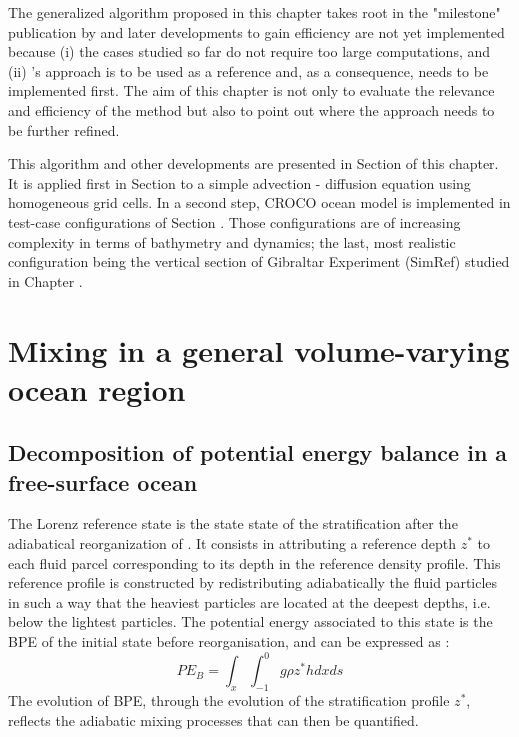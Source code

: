 The generalized algorithm proposed in this chapter takes root in the "milestone" publication by \citet{winters_available_1995} 
and later developments to gain efficiency are not yet implemented because (i) the cases studied so far do not require too large computations, and (ii) \citet{winters_available_1995}'s approach is to be used as a reference and, as a consequence, needs to be implemented first. The aim of this chapter is not only to evaluate the relevance and efficiency of the method but also to point out where the approach needs to be further refined.

This algorithm and other developments are presented in Section  of this chapter. It is applied first in Section  to a simple advection - diffusion equation using homogeneous grid cells. In a second step, CROCO ocean model is implemented in test-case configurations of Section . Those configurations are of increasing complexity in terms of bathymetry and dynamics; the last, most realistic configuration being the vertical section of Gibraltar Experiment (SimRef) studied in Chapter .

\section{Mixing in a general volume-varying ocean region}
\label{section_mix_vol}
\subsection{Decomposition of potential energy balance in a free-surface ocean}
\label{section_PE_chap2}

The Lorenz reference state is the state state of the stratification after the adiabatical reorganization of \citet{lorenz_available_1955}. It consists in attributing a reference depth $z^*$ to each fluid parcel corresponding to its depth in the reference density profile. This reference profile is constructed by redistributing adiabatically the fluid particles in such a way that the heaviest particles are located at the deepest depths, i.e. below the lightest particles. The potential energy associated to this state is the BPE of the initial state before reorganisation, and can be expressed as :
\begin{equation}
    PE_B = \int_x \int_{-1}^0 g \rho z^* h dx ds
\end{equation}
The evolution of BPE, through the evolution of the stratification profile $z^*$, reflects the adiabatic mixing processes that can then be quantified.

